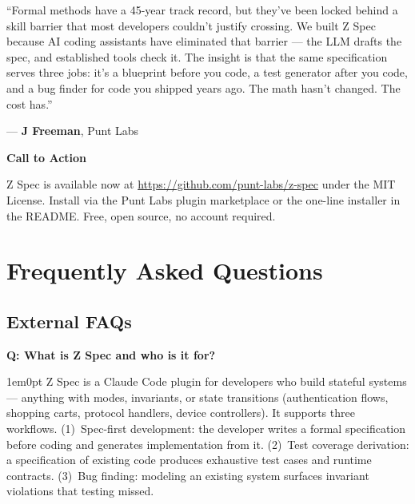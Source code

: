 \documentclass[11pt,letterpaper]{article}
\newcommand{\prsection}[1]{%
  \vspace{1em}%
  {\large\bfseries\color{SectionBlue}#1}%
  \vspace{0.3em}\par%
}
\newcounter{faqnum}
\newenvironment{faqpair}[1]{%
  \needspace{4\baselineskip}%
  \vspace{0.5em}%
  \refstepcounter{faqnum}%
  \noindent\textbf{\color{SectionBlue}Q\thefaqnum: #1}\par\nopagebreak[4]%
  \vspace{0.2em}%
  \begin{adjustwidth}{1em}{0pt}%
  \setlength{\parindent}{0pt}%
}{%
  \end{adjustwidth}%
  \vspace{0.5em}%
}
\begin{document}
\begin{spokespersonquote}
``Formal methods have a 45-year track record, but they've been locked behind a skill barrier that most developers couldn't justify crossing. We built Z Spec because AI coding assistants have eliminated that barrier --- the LLM drafts the spec, and established tools check it. The insight is that the same specification serves three jobs: it's a blueprint before you code, a test generator after you code, and a bug finder for code you shipped years ago. The math hasn't changed. The cost has.''

\raggedleft --- \textbf{J Freeman}, Punt Labs
\end{spokespersonquote}

\prsection{Call to Action}

Z Spec is available now at
\url{https://github.com/punt-labs/z-spec} under the MIT License. Install via the Punt Labs plugin marketplace or the one-line installer in the README. Free, open source, no account required.

\newpage


\section*{Frequently Asked Questions}


\subsection*{External FAQs}

\begin{faqpair}{What is Z Spec and who is it for?}\label{faq:what}
Z Spec is a Claude Code plugin for developers who build stateful systems --- anything with modes, invariants, or state transitions (authentication flows, shopping carts, protocol handlers, device controllers). It supports three workflows. (1)~Spec-first development: the developer writes a formal specification before coding and generates implementation from it. (2)~Test coverage derivation: a specification of existing code produces exhaustive test cases and runtime contracts. (3)~Bug finding: modeling an existing system surfaces invariant violations that testing missed.
\end{faqpair}
\end{document}
